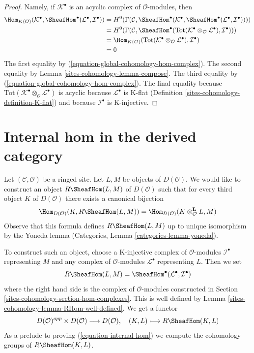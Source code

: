 \begin{proof}
Namely, if $\mathcal{K}^\bullet$ is an acyclic complex of
$\mathcal{O}$-modules, then
\begin{align*}
\Hom_{K(\mathcal{O})}(\mathcal{K}^\bullet,
\SheafHom^\bullet(\mathcal{L}^\bullet, \mathcal{I}^\bullet))
& =
H^0(\Gamma(\mathcal{C},
\SheafHom^\bullet(\mathcal{K}^\bullet,
\SheafHom^\bullet(\mathcal{L}^\bullet, \mathcal{I}^\bullet)))) \\
& =
H^0(\Gamma(\mathcal{C}, \SheafHom^\bullet(\text{Tot}(
\mathcal{K}^\bullet \otimes_\mathcal{O} \mathcal{L}^\bullet),
\mathcal{I}^\bullet))) \\
& =
\Hom_{K(\mathcal{O})}(
\text{Tot}(\mathcal{K}^\bullet \otimes_\mathcal{O} \mathcal{L}^\bullet),
\mathcal{I}^\bullet) \\
& =
0
\end{align*}
The first equality by (\ref{equation-global-cohomology-hom-complex}).
The second equality by Lemma \ref{sites-cohomology-lemma-compose}.
The third equality by (\ref{equation-global-cohomology-hom-complex}).
The final equality because
$\text{Tot}(\mathcal{K}^\bullet \otimes_\mathcal{O} \mathcal{L}^\bullet)$
is acyclic because $\mathcal{L}^\bullet$ is K-flat
(Definition \ref{sites-cohomology-definition-K-flat}) and because $\mathcal{I}^\bullet$
is K-injective.
\end{proof}

\section{Internal hom in the derived category}
\label{sites-cohomology-section-internal-hom}
Let $(\mathcal{C}, \mathcal{O})$ be a ringed site. Let $L, M$ be objects
of $D(\mathcal{O})$. We would like to construct an object
$R\SheafHom(L, M)$ of $D(\mathcal{O})$ such that for every third
object $K$ of $D(\mathcal{O})$ there exists a canonical bijection
\begin{equation}
\label{equation-internal-hom}
\Hom_{D(\mathcal{O})}(K, R\SheafHom(L, M))
=
\Hom_{D(\mathcal{O})}(K \otimes_\mathcal{O}^\mathbf{L} L, M)
\end{equation}
Observe that this formula defines $R\SheafHom(L, M)$ up to unique
isomorphism by the Yoneda lemma
(Categories, Lemma \ref{categories-lemma-yoneda}).

\medskip\noindent
To construct such an object, choose a K-injective complex of
$\mathcal{O}$-modules $\mathcal{I}^\bullet$ representing $M$ and any
complex of $\mathcal{O}$-modules $\mathcal{L}^\bullet$ representing $L$.
Then we set
$$
R\SheafHom(L, M) = \SheafHom^\bullet(\mathcal{L}^\bullet, \mathcal{I}^\bullet)
$$
where the right hand side is the complex of $\mathcal{O}$-modules
constructed in Section \ref{sites-cohomology-section-hom-complexes}.
This is well defined by Lemma \ref{sites-cohomology-lemma-RHom-well-defined}.
We get a functor
$$
D(\mathcal{O})^{opp} \times D(\mathcal{O}) \longrightarrow D(\mathcal{O}),
\quad
(K, L) \longmapsto R\SheafHom(K, L)
$$
As a prelude to proving (\ref{equation-internal-hom})
we compute the cohomology groups of $R\SheafHom(K, L)$.

